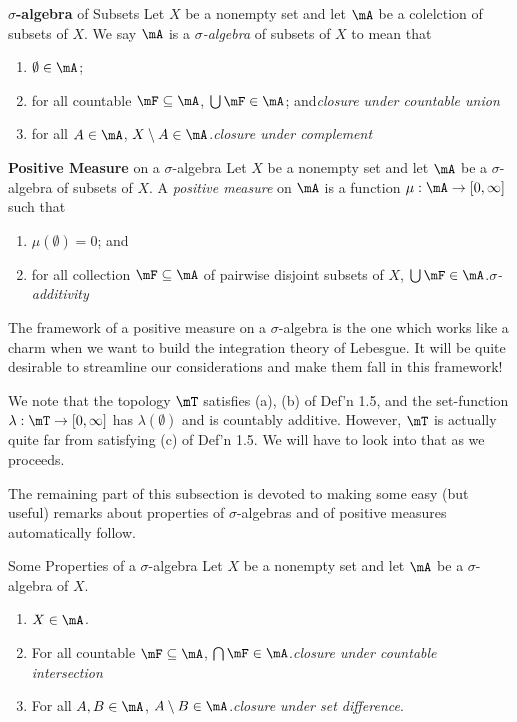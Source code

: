 \documentclass[pmath450]{subfiles}
\begin{document}
    \begin{definition}{\textbf{$\sigma$-algebra} of Subsets}
        Let $X$ be a nonempty set and let $\mA$ be a colelction of subsets of $X$. We say $\mA$ is a \emph{$\sigma$-algebra} of subsets of $X$ to mean that
        \begin{enumerate}
            \item $\emptyset\in\mA$;
            \item for all countable $\mF\subseteq\mA$, $\bigcup\mF\in\mA$; and\hfill\textit{closure under countable union}
            \item for all $A\in\mA$, $X\setminus A\in\mA$.\hfill\textit{closure under complement}
        \end{enumerate}
    \end{definition}

    \begin{definition}{\textbf{Positive Measure} on a $\sigma$-algebra}
        Let $X$ be a nonempty set and let $\mA$ be a $\sigma$-algebra of subsets of $X$. A \emph{positive measure} on $\mA$ is a function $\mu:\mA\to\left[ 0,\infty \right]$ such that
        \begin{enumerate}
            \item $\mu\left( \emptyset \right)=0$; and
            \item for all collection $\mF\subseteq\mA$ of pairwise disjoint subsets of $X$, $\bigcup\mF\in\mA$.\hfill\textit{$\sigma$-additivity}
        \end{enumerate}
    \end{definition}

    \np The framework of a positive measure on a $\sigma$-algebra is the one which works like a charm when we want to build the integration theory of Lebesgue. It will be quite desirable to streamline our considerations and make them fall in this framework!

    We note that the topology $\mT$ satisfies (a), (b) of Def'n 1.5, and the set-function $\lambda:\mT\to\left[ 0,\infty \right]$ has $\lambda\left( \emptyset \right)$ and is countably additive. However, $\mT$ is actually quite far from satisfying (c) of Def'n 1.5. We will have to look into that as we proceeds.

    The remaining part of this subsection is devoted to making some easy (but useful) remarks about properties of $\sigma$-algebras and of positive measures automatically follow.

    \begin{prop}{Some Properties of a $\sigma$-algebra}
        Let $X$ be a nonempty set and let $\mA$ be a $\sigma$-algebra of $X$.
        \begin{enumerate}
            \item $X\in\mA$.
            \item For all countable $\mF\subseteq\mA$, $\bigcap\mF\in\mA$.\hfill\textit{closure under countable intersection}
            \item For all $A,B\in\mA$, $A\setminus B\in\mA$.\hfill\textit{closure under set difference}.
        \end{enumerate}
    \end{prop}
\end{document}
